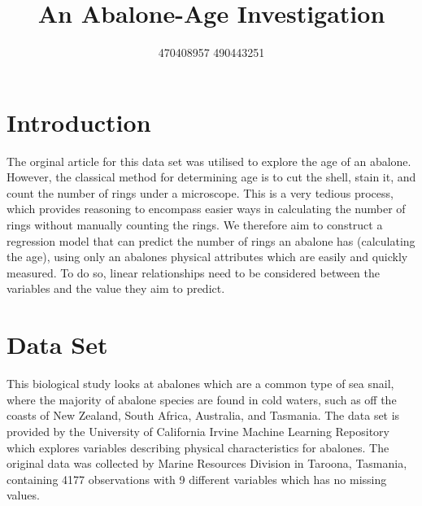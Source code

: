 \documentclass[letterpaper,9pt,twocolumn,twoside,]{pinp}
\title{An Abalone-Age Investigation}
\author[]{470408957 \textbar{} 490443251 \textbar{}}
\begin{document}
\verticaladjustment{-2pt}

\maketitle
\thispagestyle{firststyle}



\section{Introduction}\label{introduction}

The orginal article for this data set was utilised to explore the age of
an abalone. However, the classical method for determining age is to cut
the shell, stain it, and count the number of rings under a microscope.
This is a very tedious process, which provides reasoning to encompass
easier ways in calculating the number of rings without manually counting
the rings. We therefore aim to construct a regression model that can
predict the number of rings an abalone has (calculating the age), using
only an abalones physical attributes which are easily and quickly
measured. To do so, linear relationships need to be considered between
the variables and the value they aim to predict.

\section{Data Set}\label{data-set}

This biological study looks at abalones which are a common type of sea
snail, where the majority of abalone species are found in cold waters,
such as off the coasts of New Zealand, South Africa, Australia, and
Tasmania. The data set is provided by the University of California
Irvine Machine Learning Repository which explores variables describing
physical characteristics for abalones. The original data was collected
by Marine Resources Division in Taroona, Tasmania, containing 4177
observations with 9 different variables which has no missing values.
\end{document}
